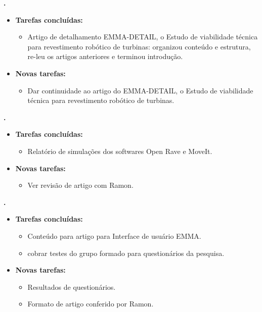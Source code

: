 	
	  \textbf{\elael.} 
	\begin{itemize}
		\item \textbf{Tarefas concluídas:}
			\begin{itemize}    
				\item Artigo de detalhamento EMMA-DETAIL, o Estudo de viabilidade técnica
				para revestimento robótico de turbinas: organizou conteúdo e estrutura, re-leu os
				artigos anteriores e terminou introdução.
			\end{itemize}
		
		\item \textbf{Novas tarefas:}
			\begin{itemize} 
			    \item Dar continuidade ao artigo do EMMA-DETAIL, o Estudo de viabilidade
			    técnica para revestimento robótico de turbinas.
			\end{itemize}
	\end{itemize}			
			
  \textbf{\renan.} 
	\begin{itemize}
		\item \textbf{Tarefas concluídas:}
			\begin{itemize}    
				\item Relatório de simulações dos softwares Open Rave e MoveIt.
			\end{itemize}
		
		\item \textbf{Novas tarefas:}
			\begin{itemize} 
			    \item Ver revisão de artigo com Ramon.
			\end{itemize}
	\end{itemize}	
			
   \textbf{\julia.} 
	\begin{itemize}
		\item \textbf{Tarefas concluídas:}
			\begin{itemize}    
				\item Conteúdo para artigo para Interface de usuário EMMA.
				\item cobrar testes do grupo formado para questionários da pesquisa.
			\end{itemize}
		
		\item \textbf{Novas tarefas:}
			\begin{itemize} 
			    \item Resultados de questionários.
			    \item Formato de artigo conferido por Ramon.
			\end{itemize}
	\end{itemize}		



